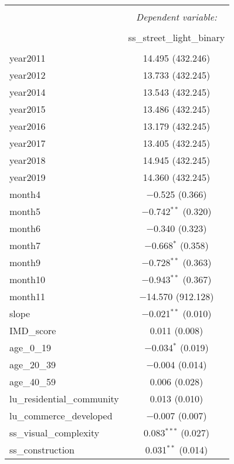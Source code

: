 \begin{table}[!htbp] \centering 
  \caption{} 
  \label{} 
\small 
\begin{tabular}{@{\extracolsep{1pt}}lc} 
\\[-1.8ex]\hline 
\hline \\[-1.8ex] 
 & \multicolumn{1}{c}{\textit{Dependent variable:}} \\ 
\cline{2-2} 
\\[-1.8ex] & ss\_street\_light\_binary \\ 
\hline \\[-1.8ex] 
 year2011 & 14.495 (432.246) \\ 
  year2012 & 13.733 (432.245) \\ 
  year2014 & 13.543 (432.245) \\ 
  year2015 & 13.486 (432.245) \\ 
  year2016 & 13.179 (432.245) \\ 
  year2017 & 13.405 (432.245) \\ 
  year2018 & 14.945 (432.245) \\ 
  year2019 & 14.360 (432.245) \\ 
  month4 & $-$0.525 (0.366) \\ 
  month5 & $-$0.742$^{**}$ (0.320) \\ 
  month6 & $-$0.340 (0.323) \\ 
  month7 & $-$0.668$^{*}$ (0.358) \\ 
  month9 & $-$0.728$^{**}$ (0.363) \\ 
  month10 & $-$0.943$^{**}$ (0.367) \\ 
  month11 & $-$14.570 (912.128) \\ 
  slope & $-$0.021$^{**}$ (0.010) \\ 
  IMD\_score & 0.011 (0.008) \\ 
  age\_0\_19 & $-$0.034$^{*}$ (0.019) \\ 
  age\_20\_39 & $-$0.004 (0.014) \\ 
  age\_40\_59 & 0.006 (0.028) \\ 
  lu\_residential\_community & 0.013 (0.010) \\ 
  lu\_commerce\_developed & $-$0.007 (0.007) \\ 
  ss\_visual\_complexity & 0.083$^{***}$ (0.027) \\ 
  ss\_construction & 0.031$^{**}$ (0.014) \\ 

\end{tabular}
\end{table}
